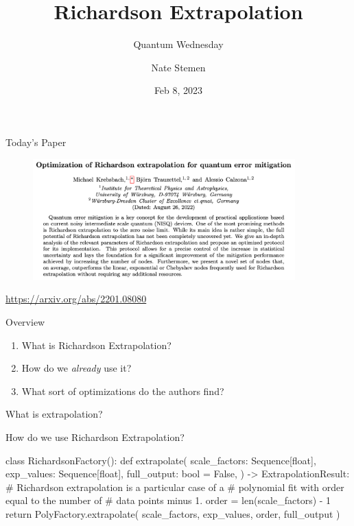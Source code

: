 \documentclass[11pt,aspectratio=1610,xcolor=dvipsnames]{beamer}
\title{Richardson Extrapolation}
\subtitle{Quantum Wednesday}
\date{Feb 8, 2023}
\author{Nate Stemen}
\begin{document}
\maketitle

\begin{frame}{Today's Paper}
	\begin{figure}[h]
		\centering
		\includegraphics[width=0.9\textwidth]{abstract.png}
	\end{figure}
	\begin{center}
		\url{https://arxiv.org/abs/2201.08080}
	\end{center}
\end{frame}

\begin{frame}{Overview}
	\begin{enumerate}
		\item What is Richardson Extrapolation?
		\item How do we \emph{already} use it?
		\item What sort of optimizations do the authors find?
	\end{enumerate}
\end{frame}

\begin{frame}{What is extrapolation?}

\end{frame}

\begin{frame}[fragile]{How do we use Richardson Extrapolation?}
	\begin{python}
		class RichardsonFactory():
			def extrapolate(
				scale_factors: Sequence[float],
				exp_values: Sequence[float],
				full_output: bool = False,
			) -> ExtrapolationResult:
				# Richardson extrapolation is a particular case of a
				# polynomial fit with order equal to the number of
				# data points minus 1.
				order = len(scale_factors) - 1
				return PolyFactory.extrapolate(
					scale_factors, exp_values, order, full_output
				)
	\end{python}
\end{frame}
\end{document}
